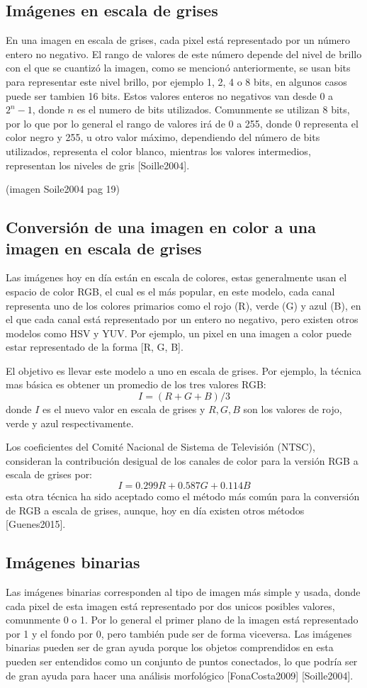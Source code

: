 \subsection{Imágenes en escala de grises}
En una imagen en escala de grises, cada pixel está representado por un número entero no negativo. El rango de valores de este número depende del nivel de brillo con el que se cuantizó la imagen, como se mencionó anteriormente, se usan bits para representar este nivel brillo, por ejemplo 1, 2, 4 o 8 bits, en algunos casos puede ser tambien 16 bits. Estos valores enteros no negativos van desde 0 a $2^{n} - 1$, donde $n$ es el numero de bits utilizados. Comunmente se utilizan 8 bits, por lo que por lo general el rango de valores irá de 0 a 255, donde 0 representa el color negro y 255, u otro valor máximo, dependiendo del número de bits utilizados, representa el color blanco, mientras los valores intermedios, representan los niveles de gris [Soille2004].

(imagen Soile2004 pag 19)

\subsection{Conversión de una imagen en color a una imagen en escala de grises}
Las imágenes hoy en día están en escala de colores, estas generalmente usan el espacio de color RGB, el cual es el más popular, en este modelo, cada canal representa uno de los colores primarios como el rojo (R), verde (G) y azul (B), en el que cada canal está representado por un entero no negativo, pero existen otros modelos como HSV y YUV. Por ejemplo, un pixel en una imagen a color puede estar representado de la forma [R, G, B].

El objetivo es llevar este modelo a uno en escala de grises. Por ejemplo, la técnica mas básica es obtener un promedio de los tres valores RGB:
\[
I = (R + G + B) / 3
\]
donde $I$ es el nuevo valor en escala de grises y $R, G, B$ son los valores de rojo, verde y azul respectivamente.

Los coeficientes del Comité Nacional de Sistema de Televisión (NTSC), consideran la contribución desigual de los canales de color para la versión RGB a escala de grises por:
\[
I = 0.299 R + 0.587 G + 0.114 B
\]
esta otra técnica ha sido aceptado como el método más común para la conversión de RGB a escala de grises, aunque, hoy en día existen otros métodos [Guenes2015].

\subsection{Imágenes binarias}
Las imágenes binarias corresponden al tipo de imagen más simple y usada, donde cada pixel de esta imagen está representado por dos unicos posibles valores, comunmente 0 o 1. Por lo general el primer plano de la imagen está representado por 1 y el fondo por 0, pero también pude ser de forma viceversa. Las imágenes binarias pueden ser de gran ayuda porque los objetos comprendidos en esta pueden ser entendidos como un conjunto de puntos conectados, lo que podría ser de gran ayuda para hacer una análisis morfológico [FonaCosta2009] [Soille2004].

